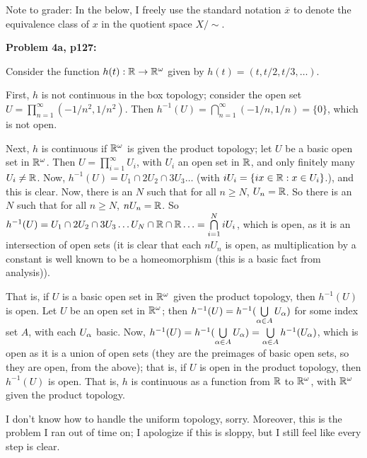 \documentclass[a4paper,12pt]{article}
\begin{document}
Note to grader: In the below, I freely use the standard notation $\overline{x}$ to denote the equivalence class of $x$ in the quotient space $X/\sim$.

{\bf Problem 4a, p127:}

Consider the function $h(t): \mathbb{R} \to \mathbb{R}^\omega$ given by $h(t) = (t,t/2,t/3,\ldots)$.

First, $h$ is not continuous in the box topology; consider the open set $U=\prod\limits_{n=1}^\infty (-1/n^2,1/n^2)$. Then $h^{-1}(U) = \bigcap\limits_{n=1}^\infty (-1/n,1/n) = \{0\}$, which is not open. 

Next, $h$ is continuous if $\mathbb{R}^\omega$ is given the product topology; let $U$ be a basic open set in $\mathbb{R}^\omega$. Then $U = \prod\limits_{i=1}^\infty U_i$, with $U_i$ an open set in $\mathbb{R}$, and only finitely many $U_i \neq \mathbb{R}$. Now, $h^{-1}(U) = U_1 \cap 2U_2 \cap 3U_3 \ldots$ (with $iU_i = \{ix \in \mathbb{R}: x \in U_i\}$.), and this is clear. Now, there is an $N$ such that for all $n \geq N$, $U_n = \mathbb{R}$. So there is an $N$ such that for all $n \geq N$, $nU_n = \mathbb{R}$. So $h^{-1}(U) = U_1 \cap 2U_2 \cap 3U_3 \ldots U_N \cap \mathbb{R} \cap \mathbb{R} \ldots = \bigcap\limits_{i=1}^N iU_i$, which is open, as it is an intersection of open sets (it is clear that each $nU_n$ is open, as multiplication by a constant is well known to be a homeomorphism (this is a basic fact from analysis)).

That is, if $U$ is a basic open set in $\mathbb{R}^\omega$ given the product topology, then $h^{-1}(U)$ is open. Let $U$ be an open set in $\mathbb{R}^\omega$; then $h^{-1}(U) = h^{-1}(\bigcup\limits_{\alpha \in A} U_\alpha)$ for some index set $A$, with each $U_\alpha$ basic. Now,  $h^{-1}(U) = h^{-1}(\bigcup\limits_{\alpha \in A} U_\alpha) =\bigcup\limits_{\alpha \in A}h^{-1}( U_\alpha)$, which is open as it is a union of open sets (they are the preimages of basic open sets, so they are open, from the above); that is, if $U$ is open in the product topology, then $h^{-1}(U)$ is open. That is, $h$ is continuous as a function from $\mathbb{R}$ to $\mathbb{R}^\omega$, with $\mathbb{R}^\omega$ given the product topology.

I don't know how to handle the uniform topology, sorry. Moreover, this is the problem I ran out of time on; I apologize if this is sloppy, but I still feel like every step is clear.

\end{document}
